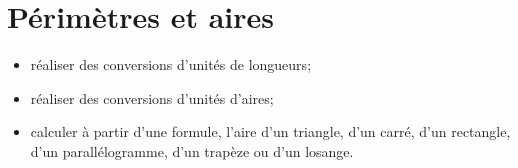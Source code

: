 \chapter{Périmètres et aires}\label{ChPerimetresAires}
\begin{acquis}
\begin{itemize}
\item réaliser des conversions d'unités de longueurs;
\item réaliser des conversions d'unités d'aires;
\item calculer à partir d'une formule, l'aire d'un triangle, d'un carré, d'un rectangle, d'un parallélogramme, d'un trapèze ou d'un losange.
\end{itemize}
\end{acquis}

\activites



\cours


\exercicesbase
\begin{colonne*exercice}

\end{colonne*exercice}


\exercicesappr
\begin{colonne*exercice}

\end{colonne*exercice}

\connaissances


\TravauxPratiques %


\pagebreak

\recreation




